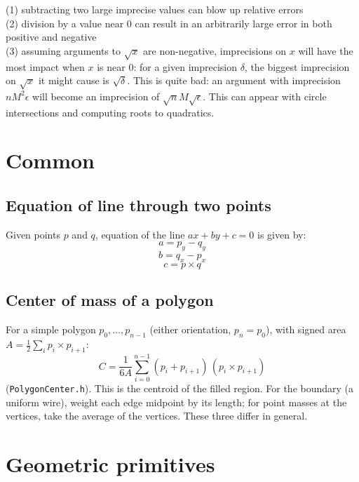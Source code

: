 	(1) subtracting two large imprecise values can blow up relative errors \\
	(2) division by a value near $0$ can result in an arbitrarily large error in both positive and negative \\
	(3) assuming arguments to $\sqrt{x}$ are non-negative, imprecisions on $x$ will have the most impact when $x$ is near $0$: for a given imprecision $\delta$, the biggest imprecision on $\sqrt{x}$ it might cause is $\sqrt{\delta}$. This is quite bad: an argument with imprecision $nM^2\epsilon$ will become an imprecision of $\sqrt{n}M\sqrt{\epsilon}$. This can appear with circle intersections and computing roots to quadratics. \\


\section{Common}
	\subsection{Equation of line through two points}
		Given points $p$ and $q$, equation of the line $ax + by + c = 0$ is given by:
		\small
		\[ a = p_y - q_y \]
		\[ b = q_x - p_x \]
		\[ c = p \times q \]
		\normalsize

	\subsection{Center of mass of a polygon}
		For a simple polygon $p_0, \dots, p_{n-1}$ (either orientation, $p_n = p_0$), with signed area $A = \frac12 \sum_i p_i \times p_{i+1}$:
		\[ C = \frac{1}{6A} \sum_{i=0}^{n-1} (p_i + p_{i+1})\,(p_i \times p_{i+1}) \]
		(\texttt{PolygonCenter.h}). This is the centroid of the filled region. For the boundary (a uniform wire), weight each edge midpoint by its length; for point masses at the vertices, take the average of the vertices. These three differ in general.

\section{Geometric primitives}

